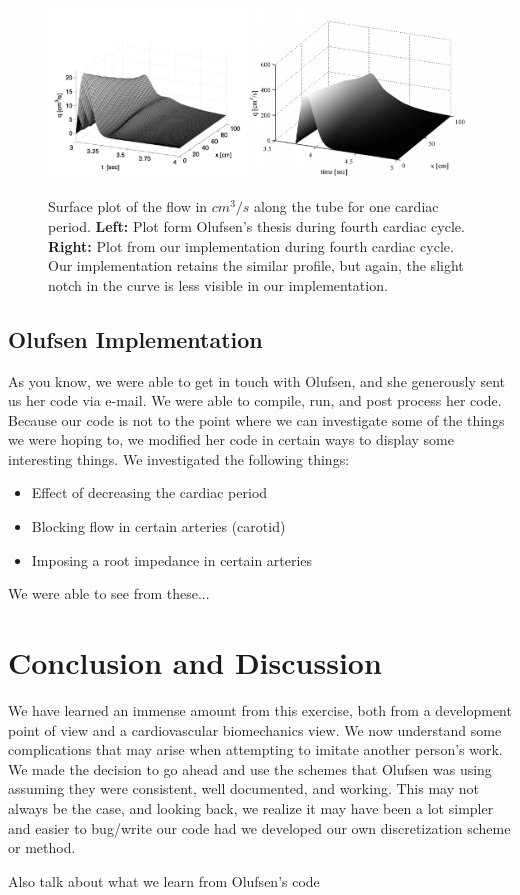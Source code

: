 \documentclass[12pt]{article}
\begin{document}
\begin{figure}[ht]
	\centering
	\includegraphics[width=6in]{qplot}
	\label{ours}
	\caption{Surface plot of the flow in $cm^3/s$ along the tube for one cardiac period. \textbf{Left:} Plot form Olufsen's thesis during fourth cardiac cycle. \textbf{Right: } Plot from our implementation during fourth cardiac cycle. Our implementation retains the similar profile, but again, the slight notch in the curve is less visible in our implementation.}
\end{figure}

\pagebreak

\subsection{Olufsen Implementation}
As you know, we were able to get in touch with Olufsen, and she generously sent us her code via e-mail. We were able to compile, run, and post process her code. Because our code is not to the point where we can investigate some of the things we were hoping to, we modified her code in certain ways to display some interesting things. We investigated the following things:

\begin{itemize}
	\item
		Effect of decreasing the cardiac period
	\item
		Blocking flow in certain arteries (carotid)
	\item
		Imposing a root impedance in certain arteries
\end{itemize}

We were able to see from these...

\section{Conclusion and Discussion}
We have learned an immense amount from this exercise, both from a development point of view and a cardiovascular biomechanics view. We now understand some complications that may arise when attempting to imitate another person's work. We made the decision to go ahead and use the schemes that Olufsen was using assuming they were consistent, well documented, and working. This may not always be the case, and looking back, we realize it may have been a lot simpler and easier to bug/write our code had we developed our own discretization scheme or method. 

Also talk about what we learn from Olufsen's code



\end{document}
